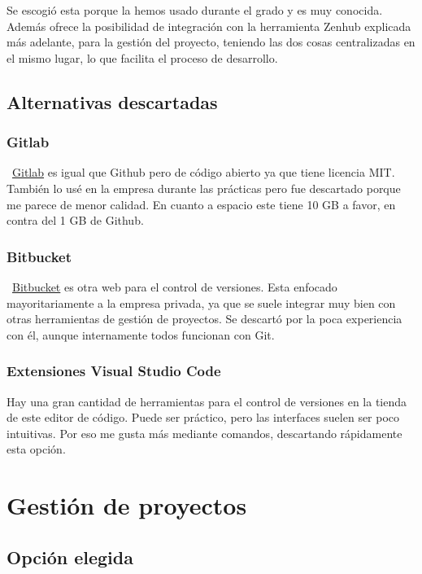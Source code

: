 Se escogió esta porque la hemos usado durante el grado y es muy conocida. Además ofrece la posibilidad de integración con la herramienta Zenhub explicada más adelante, para la gestión del proyecto, teniendo las dos cosas centralizadas en el mismo lugar, lo que facilita el proceso de desarrollo.

\subsection{Alternativas descartadas}

\subsubsection{Gitlab}
~\href{https://gitlab.com/}{Gitlab} es igual que Github pero de código abierto ya que tiene licencia MIT. También lo usé en la empresa durante las prácticas pero fue descartado porque me parece de menor calidad. En cuanto a espacio este tiene 10 GB a favor, en contra del 1 GB de Github.

\subsubsection{Bitbucket}
~\href{https://bitbucket.org/product//}{Bitbucket} es otra web para el control de versiones. Esta enfocado mayoritariamente a la empresa privada, ya que se suele integrar muy bien con otras herramientas de gestión de proyectos. Se descartó por la poca experiencia con él, aunque internamente todos funcionan con Git.

\subsubsection{Extensiones Visual Studio Code}
Hay una gran cantidad de herramientas para el control de versiones en la tienda de este editor de código. Puede ser práctico, pero las interfaces suelen ser poco intuitivas. Por eso me gusta más mediante comandos, descartando rápidamente esta opción.

\section{Gestión de proyectos}

\subsection{Opción elegida}

